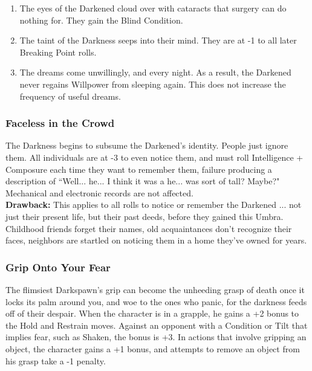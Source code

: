     \begin{enumerate}
\item The eyes of the Darkened cloud over with cataracts that surgery can do nothing for. They gain the Blind Condition.
\item The taint of the Darkness seeps into their mind. They are at -1 to all later Breaking Point rolls.
\item The dreams come unwillingly, and every night. As a result, the Darkened never regains Willpower from sleeping again. This does not increase the frequency of useful dreams.                                                                                                                         \end{enumerate}

\subsubsection*{Faceless in the Crowd}
The Darkness begins to subsume the Darkened's identity. People just ignore them. All individuals are at -3 to even notice them, and must roll Intelligence + Composure each time they want to remember them, failure producing a description of \textquotedblleft Well... he... I think it was a he... was sort of tall? Maybe?" Mechanical and electronic records are not affected. \\

\noindent \textbf{Drawback:} This applies to all rolls to notice or remember the Darkened ... not just their present life, but their past deeds, before they gained this Umbra. Childhood friends forget their names, old acquaintances don't recognize their faces, neighbors are startled on noticing them in a home they've owned for years. 

\subsubsection*{Grip Onto Your Fear}

The flimsiest Darkspawn’s grip can become the unheeding grasp of death once it locks its palm around you, and woe to the ones who panic, for the darkness feeds off of their despair. When the character is in a grapple, he gains a +2 bonus to the Hold and Restrain moves. Against an opponent with a Condition or Tilt that implies fear, such as Shaken, the bonus is +3. In actions that involve gripping an object, the character gains a +1 bonus, and attempts to remove an object from his grasp take a -1 penalty.

